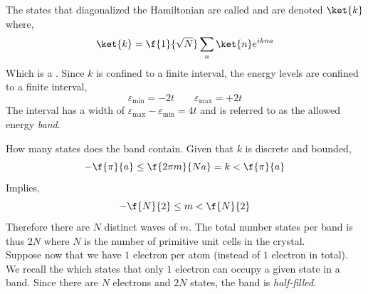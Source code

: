 \documentclass{article}
\begin{document}
The states that diagonalized the Hamiltonian are called  and are denoted $\ket{k}$ where,
\[ \ket{k} = \f{1}{\sqrt{N}} \sum_{n} \ket{n} e^{i k na} \]
Which is a . Since $k$ is confined to a finite interval, the energy levels are confined to a finite interval,
\[ \varepsilon_{\min} = - 2t \qquad \varepsilon_{\max} = + 2t \]
The interval has a width of $\varepsilon_{\max} - \varepsilon_{\min} = 4t$ and is referred to as the allowed energy \textit{band}.

\begin{center}
\end{center}

How many states does the band contain. Given that $k$ is discrete and bounded,
\[ -\f{\pi}{a} \leq \f{2 \pi m}{Na} = k < \f{\pi}{a} \]
Implies,
\[ -\f{N}{2} \leq m < \f{N}{2} \]
Therefore there are $N$ distinct waves of $m$. The total number states per band is thus $2N$ where $N$ is the number of primitive unit cells in the crystal.\\

Suppose now that we have $1$ electron per atom (instead of $1$ electron in total). We recall the  which states that only $1$ electron can occupy a given state in a band. Since there are $N$ electrons and $2N$ states, the band is \textit{half-filled}.
\begin{center}
\end{center}
\end{document}
